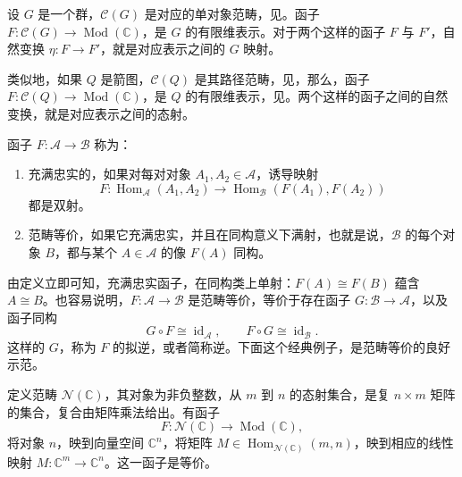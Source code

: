 \begin{example}\label{ex:4.11}
设 $G$ 是一个群，$\mathcal{C}(G)$ 是对应的单对象范畴，见。函子 $F\colon\mathcal{C}(G)\to\operatorname{Mod}(\mathbb{C})$，是 $G$ 的有限维表示。对于两个这样的函子 $F$ 与 $F'$，自然变换 $\eta\colon F\to F'$，就是对应表示之间的 $G$ 映射。

类似地，如果 $Q$ 是箭图，$\mathcal{C}(Q)$ 是其路径范畴，见，那么，函子 $F\colon\mathcal{C}(Q)\to\operatorname{Mod}(\mathbb{C})$，是 $Q$ 的有限维表示，见。两个这样的函子之间的自然变换，就是对应表示之间的态射。
\end{example}

\begin{definition}\label{def:4.12}
函子 $F\colon\mathcal{A}\to\mathcal{B}$ 称为：
\begin{enumerate}[label=(\alph*)]
\item 充满忠实的，如果对每对对象 $A_1,A_2\in\mathcal{A}$，诱导映射
\[
F\colon\operatorname{Hom}_{\mathcal{A}}(A_1,A_2)
\longrightarrow\operatorname{Hom}_{\mathcal{B}}(F(A_1),F(A_2))
\]
都是双射。
\item 范畴等价，如果它充满忠实，并且在同构意义下满射，也就是说，$\mathcal{B}$ 的每个对象 $B$，都与某个 $A\in\mathcal{A}$ 的像 $F(A)$ 同构。
\end{enumerate}
\end{definition}

由定义立即可知，充满忠实函子，在同构类上单射：$F(A)\cong F(B)$ 蕴含 $A\cong B$。也容易说明，$F\colon\mathcal{A}\to\mathcal{B}$ 是范畴等价，等价于存在函子 $G\colon\mathcal{B}\to\mathcal{A}$，以及函子同构
\[
G\circ F\cong\operatorname{id}_{\mathcal{A}},
\qquad F\circ G\cong\operatorname{id}_{\mathcal{B}}.
\]
这样的 $G$，称为 $F$ 的拟逆，或者简称逆。下面这个经典例子，是范畴等价的良好示范。

\begin{example}\label{ex:4.13}
定义范畴 $\mathcal{N}(\mathbb{C})$，其对象为非负整数，从 $m$ 到 $n$ 的态射集合，是复 $n\times m$ 矩阵的集合，复合由矩阵乘法给出。有函子
\[
F\colon\mathcal{N}(\mathbb{C})\longrightarrow\operatorname{Mod}(\mathbb{C}),
\]
将对象 $n$，映到向量空间 $\mathbb{C}^n$，将矩阵 $M\in\operatorname{Hom}_{\mathcal{N}(\mathbb{C})}(m,n)$，映到相应的线性映射 $M\colon\mathbb{C}^m\to\mathbb{C}^n$。这一函子是等价。
\end{example}

